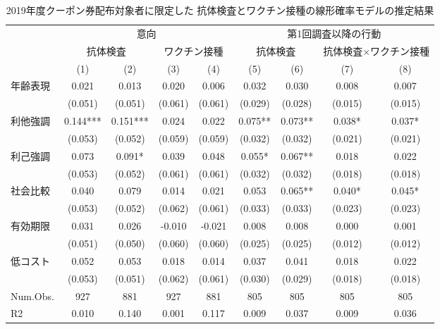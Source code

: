\documentclass[
  11pt,
  a4paper,
]{article}
\begin{document}
\begin{table}

\caption{\label{tab:RegCoupon1}2019年度クーポン券配布対象者に限定した 抗体検査とワクチン接種の線形確率モデルの推定結果}
\centering
\fontsize{9}{11}\selectfont
\begin{threeparttable}
\begin{tabular}[t]{lcccccccc}
\toprule
\multicolumn{1}{c}{ } & \multicolumn{4}{c}{意向} & \multicolumn{4}{c}{第1回調査以降の行動} \\
\cmidrule(l{3pt}r{3pt}){2-5} \cmidrule(l{3pt}r{3pt}){6-9}
\multicolumn{1}{c}{ } & \multicolumn{2}{c}{抗体検査} & \multicolumn{2}{c}{ワクチン接種} & \multicolumn{2}{c}{抗体検査} & \multicolumn{2}{c}{抗体検査×ワクチン接種} \\
\cmidrule(l{3pt}r{3pt}){2-3} \cmidrule(l{3pt}r{3pt}){4-5} \cmidrule(l{3pt}r{3pt}){6-7} \cmidrule(l{3pt}r{3pt}){8-9}
  & (1) & (2) & (3) & (4) & (5) & (6) & (7) & (8)\\
\midrule
年齢表現 & 0.021 & 0.013 & 0.020 & 0.006 & 0.032 & 0.030 & 0.008 & 0.007\\
 & (0.051) & (0.051) & (0.061) & (0.061) & (0.029) & (0.028) & (0.015) & (0.015)\\
利他強調 & 0.144*** & 0.151*** & 0.024 & 0.022 & 0.075** & 0.073** & 0.038* & 0.037*\\
 & (0.053) & (0.052) & (0.059) & (0.059) & (0.032) & (0.032) & (0.021) & (0.021)\\
利己強調 & 0.073 & 0.091* & 0.039 & 0.048 & 0.055* & 0.067** & 0.018 & 0.022\\
 & (0.053) & (0.052) & (0.061) & (0.061) & (0.032) & (0.032) & (0.018) & (0.018)\\
社会比較 & 0.040 & 0.079 & 0.014 & 0.021 & 0.053 & 0.065** & 0.040* & 0.045*\\
 & (0.053) & (0.052) & (0.062) & (0.061) & (0.033) & (0.033) & (0.023) & (0.023)\\
有効期限 & 0.031 & 0.026 & -0.010 & -0.021 & 0.008 & 0.008 & 0.000 & 0.001\\
 & (0.051) & (0.050) & (0.060) & (0.060) & (0.025) & (0.025) & (0.012) & (0.012)\\
低コスト & 0.052 & 0.053 & 0.018 & 0.014 & 0.037 & 0.041 & 0.018 & 0.022\\
 & (0.053) & (0.051) & (0.062) & (0.061) & (0.030) & (0.029) & (0.018) & (0.018)\\
\midrule
Num.Obs. & 927 & 881 & 927 & 881 & 805 & 805 & 805 & 805\\
R2 & 0.010 & 0.140 & 0.001 & 0.117 & 0.009 & 0.037 & 0.009 & 0.036\\

\end{tabular}
\end{threeparttable}
\end{table}
\end{document}

